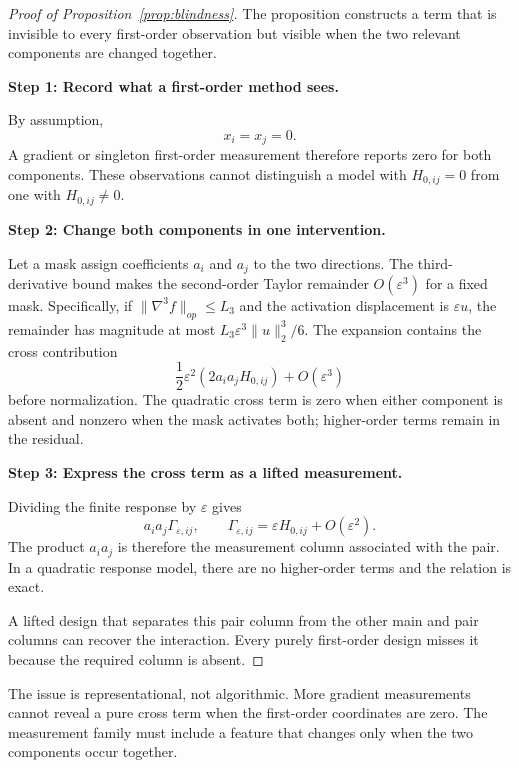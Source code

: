 \documentclass[sigconf,10pt,nonacm,balance=false]{acmart}
\newcommand{\eps}{\varepsilon}
\begin{document}
\begin{proof}[Proof of Proposition~\ref{prop:blindness}]
The proposition constructs a term that is invisible to every first-order observation but visible when the two relevant components are changed together.

\noindent\textbf{Step 1: Record what a first-order method sees.}\par
By assumption,
\[
    x_i=x_j=0.
\]
A gradient or singleton first-order measurement therefore reports zero for both components. These observations cannot distinguish a model with $H_{0,ij}=0$ from one with $H_{0,ij}\neq0$.

\noindent\textbf{Step 2: Change both components in one intervention.}\par
Let a mask assign coefficients $a_i$ and $a_j$ to the two directions. The third-derivative bound makes the second-order Taylor remainder $O(\eps^3)$ for a fixed mask. Specifically, if $\|\nabla^3 f\|_{op}\le L_3$ and the activation displacement is $\eps u$, the remainder has magnitude at most $L_3\eps^3\|u\|_2^3/6$. The expansion contains the cross contribution
\begin{equation}
    \frac{1}{2}\eps^2
    \left(2a_i a_jH_{0,ij}\right)
    +
    O(\eps^3)
\end{equation}
before normalization. The quadratic cross term is zero when either component is absent and nonzero when the mask activates both; higher-order terms remain in the residual.

\noindent\textbf{Step 3: Express the cross term as a lifted measurement.}\par
Dividing the finite response by $\eps$ gives
\begin{equation}
    a_i a_j\Gamma_{\eps,ij},
    \qquad
    \Gamma_{\eps,ij}
    =
    \eps H_{0,ij}+O(\eps^2).
\end{equation}
The product $a_i a_j$ is therefore the measurement column associated with the pair. In a quadratic response model, there are no higher-order terms and the relation is exact.

A lifted design that separates this pair column from the other main and pair columns can recover the interaction. Every purely first-order design misses it because the required column is absent.
\end{proof}

The issue is representational, not algorithmic. More gradient measurements cannot reveal a pure cross term when the first-order coordinates are zero. The measurement family must include a feature that changes only when the two components occur together.
\end{document}
